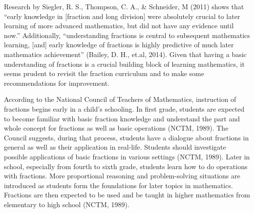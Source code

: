 \documentclass[11.5pt]{sig-alternate} %
\begin{document}
\begin{large}
Research by Siegler, R. S., Thompson, C. A., \& Schneider, M (2011) shows that “early knowledge in [fraction and long division] were absolutely crucial to later learning of more advanced mathematics, but did not have any evidence until now.” Additionally, “understanding fractions is central to subsequent mathematics learning, [and] early knowledge of fractions is highly predictive of much later mathematics achievement” (Bailey, D. H., et.al, 2014). Given that having a basic understanding of fractions is a crucial building block of learning mathematics, it seems prudent to revisit the fraction curriculum and to make some recommendations for improvement. 

According to the National Council of Teachers of Mathematics, instruction of fractions begins early in a child’s schooling. In first grade, students are expected to become familiar with basic fraction knowledge and understand the part and whole concept for fractions as well as basic operations (NCTM, 1989). The Council suggests, during that process, students have a dialogue about fractions in general as well as their application in real-life. Students should investigate possible applications of basic fractions in various settings (NCTM, 1989). Later in school, especially from fourth to sixth grade, students learn how to do operations with fractions. More proportional reasoning and problem-solving situations are introduced as students form the foundations for later topics in mathematics. Fractions are then expected to be used and be taught in higher mathematics from elementary to high school (NCTM, 1989).


\end{large}
\end{document}
